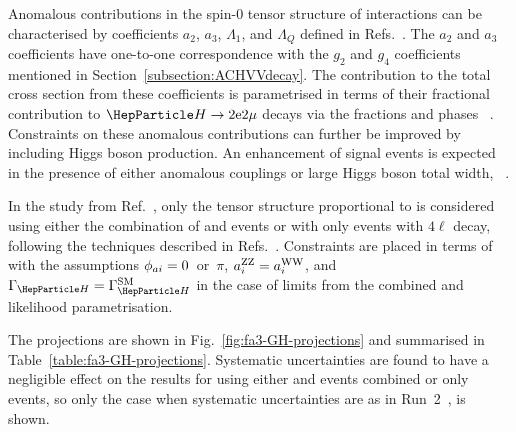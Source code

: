 Anomalous contributions in the spin-0 tensor structure of \HVV interactions can be characterised by coefficients $a_2$, $a_3$, $\Lambda_1$, and $\Lambda_Q$ defined in Refs.~\cite{Khachatryan:2014kca, Khachatryan:2015mma}. The $a_2$ and $a_3$ coefficients have one-to-one correspondence with the $g_2$ and $g_4$ coefficients mentioned in Section~\ref{subsection:ACHVVdecay}.
The contribution to the total cross section from these coefficients is parametrised in terms of their fractional contribution to \onshell $\PH\to2\mathrm{e}2\mathrm{\mu}$ decays via the fractions \fai and phases \pai~\cite{Khachatryan:2014kca, Khachatryan:2015mma}.
Constraints on these anomalous contributions can further be improved by including \offshell Higgs boson production. An enhancement of signal events is expected in the presence of either anomalous \HVV couplings or large Higgs boson total width, \GH~\cite{Khachatryan:2015mma,deFlorian:2016spz,CMS-PAS-HIG-18-002}.

In the study from Ref.~\cite{CMS-PAS-FTR-18-011}, only the tensor structure proportional to  is considered using either the combination of \onshell and \offshell events or with only \onshell events with $4\ell$ decay, following the techniques described in Refs.~\cite{Khachatryan:2014kca,deFlorian:2016spz,CMS-PAS-HIG-18-002}. Constraints are placed in terms of \fcospai with the assumptions $\phi_{a i}=0$~or~$\pi$, $a_{i}^\mathrm{ZZ}=a_{i}^\mathrm{WW}$, and ${\GH}={\GHSM}$ in the case of limits from the combined \onshell and \offshell likelihood parametrisation.

The projections are shown in Fig.~\ref{fig:fa3-GH-projections} and summarised in Table~\ref{table:fa3-GH-projections}. Systematic uncertainties are found to have a negligible effect on the results for  using either \onshell and \offshell events combined or only \onshell events, so only the case when systematic uncertainties are as in Run~2~\cite{CMS-PAS-HIG-18-002}, is shown.


